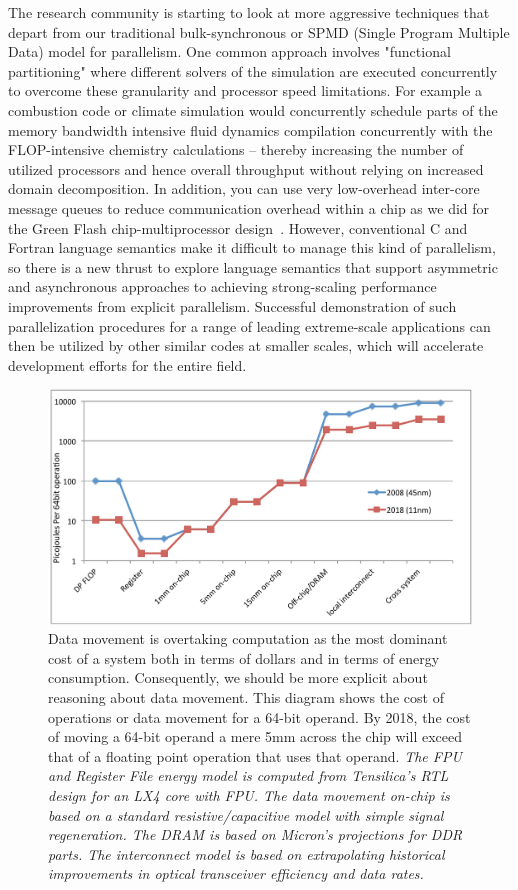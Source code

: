 The research community is starting to look at more aggressive techniques that depart from our traditional bulk-synchronous or SPMD (Single Program Multiple Data) model for parallelism.   One common approach involves "functional partitioning" where different solvers of the simulation are executed concurrently to overcome these granularity and processor speed limitations.   For example a combustion code or climate simulation would concurrently schedule parts of the memory bandwidth intensive fluid dynamics compilation concurrently with the FLOP-intensive chemistry calculations -- thereby increasing the number of utilized processors and hence overall throughput without relying on increased domain decomposition.  In addition, you can use very low-overhead inter-core message queues to reduce communication overhead within a chip as we did for the Green Flash chip-multiprocessor design~\cite{GreenFlash}.  However, conventional C and Fortran language semantics make it difficult to manage this kind of parallelism, so there is a new thrust to explore language semantics that support asymmetric and asynchronous approaches to achieving strong-scaling performance improvements from explicit parallelism.  Successful demonstration of such parallelization procedures for a range of leading extreme-scale applications can then be utilized by other similar codes at smaller scales, which will accelerate development efforts for the entire field.

\begin{figure}\begin{centering}
\includegraphics[width=0.95\columnwidth]{background/figures/DataMovement2.pdf}
\caption{Data movement is overtaking computation as the most dominant cost of a system both in terms of dollars and in terms of energy consumption.  Consequently, we should be more explicit about reasoning about data movement. This diagram shows the cost of operations or data movement for a 64-bit operand.  By 2018, the cost of moving a 64-bit operand a mere 5mm across the chip will exceed that of a floating point operation that uses that operand. {\em The FPU and Register File energy model is computed from Tensilica's RTL design for an LX4 core with FPU.  The data movement on-chip is based on a standard resistive/capacitive model with simple signal regeneration.  The DRAM is based on Micron's projections for DDR parts.  The interconnect model is based on extrapolating historical improvements in optical transceiver efficiency and data rates.}}
\label{fig:datamovement}
\end{centering}\end{figure}

